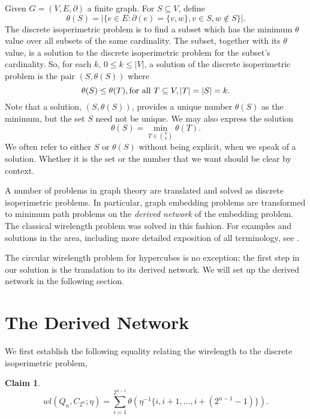\documentclass[12pt]{ucthesis}
\theoremstyle{plain}
\newtheorem{claim}{Claim}
\theoremstyle{definition}
\begin{document}
Given $G = (V, E, \partial)$ a finite graph.
For $S \subseteq V$, define
\begin{equation*}
\theta(S) = |\{e \in E \colon \partial(e) = \{v, w\}, v \in S, w \notin S\}|.
\end{equation*}
The discrete isoperimetric problem is to find a subset which has the minimum $\theta$ value
over all subsets of the same cardinality.
The subset, together with its $\theta$ value,
is a solution to the discrete isoperimetric problem for the subset's cardinality.
So, for each $k$, $0 \le k \le |V|$,
a solution of the discrete isoperimetric problem is the pair $(S, \theta(S))$ where
\begin{equation*}
\theta(S) \le \theta(T), \textnormal{for all }T \subseteq V, |T| = |S| = k.
\end{equation*}
Note that a solution, $(S, \theta(S))$,
provides a unique number $\theta(S)$ as the minimum,
but the set $S$ need not be unique.
We may also express the solution
\begin{equation*}
\theta(S) = \min_{T \in \binom{V}{k}} \theta(T).
\end{equation*}
We often refer to either $S$ or $\theta(S)$ without being explicit,
when we speak of a solution.
Whether it is the set or the number that we want should be clear by context.

A number of problems in graph theory are translated and solved as discrete isoperimetric problems.
In particular, graph embedding problems are transformed to minimum path problems
on the \emph{derived network} of the embedding problem.
The classical wirelength problem was solved in this fashion.
For examples and solutions in the area,
including more detailed exposition of all terminology, see \cite{Harper.2004}.

The circular wirelength problem for hypercubes is no exception;
the first step in our solution is the translation to its derived network.
We will set up the derived network in the following section.

\section{The Derived Network}
\label{Section 2.3}

We first establish the following equality relating the wirelength to the discrete isoperimetric problem,
\begin{claim}
\label{Claim 1}
\begin{equation*}
wl(Q_n, C_{2^n}; \eta) = \sum_{i = 1}^{2^{n - 1}} \theta(\eta^{-1}\{i, i + 1, \dots, i + (2^{n - 1} - 1)\}).
\end{equation*}
\end{claim}
\end{document}
